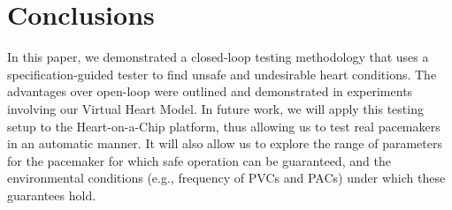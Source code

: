 \section{Conclusions}
\label{conclusion}

In this paper, we demonstrated a closed-loop testing methodology that uses a specification-guided tester to find unsafe and undesirable heart conditions.
The advantages over open-loop were outlined and demonstrated in experiments involving our Virtual Heart Model.
In future work, we will apply this testing setup to the Heart-on-a-Chip platform, thus allowing us to test real pacemakers in an automatic manner.
It will also allow us to explore the range of parameters for the pacemaker for which safe operation can be guaranteed, and the environmental conditions (e.g., frequency of PVCs and PACs) under which these guarantees hold.
